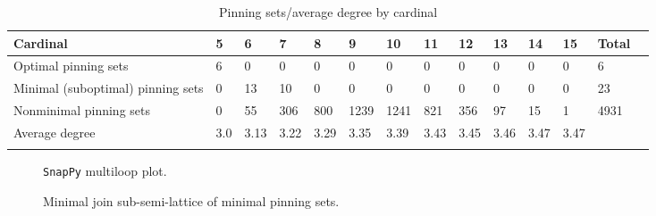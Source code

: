 \documentclass{article}%
\begin{document}
\begin{table}[ht]
	\caption{Pinning sets/average degree by cardinal}
	\centering
	\renewcommand{\arraystretch}{1.5}
	\begin{tabularx}{\textwidth}{lXXXXXXXXXXXXX}
		\toprule
			Cardinal & 5 & 6 & 7 & 8 & 9 & 10 & 11 & 12 & 13 & 14 & 15 & Total\\
			\hline
			Optimal pinning sets & 6 & 0 & 0 & 0 & 0 & 0 & 0 & 0 & 0 & 0 & 0 & 6 \\
			Minimal (suboptimal) pinning sets & 0 & 13 & 10 & 0 & 0 & 0 & 0 & 0 & 0 & 0 & 0 & 23 \\
			Nonminimal pinning sets & 0 & 55 & 306 & 800 & 1239 & 1241 & 821 & 356 & 97 & 15 & 1 & 4931 \\
			Average degree & 3.0 & 3.13 & 3.22 & 3.29 & 3.35 & 3.39 & 3.43 & 3.45 & 3.46 & 3.47 & 3.47 &  \\
		\bottomrule \\ 
	\end{tabularx}
\end{table}

\begin{multicols}{2}
\begin{figure}[H]
\centering

\caption{\texttt{SnapPy} multiloop plot.}
\label{fig:tex/img/[[17, 26, 18, 1], [16, 7, 17, 8], [25, 6, 26, 7], [18, 6, 19, 5], [1, 22, 2, 23], [8, 23, 9, 24], [24, 15, 25, 16], [19, 10, 20, 11], [11, 4, 12, 5], [12, 21, 13, 22], [2, 13, 3, 14], [9, 14, 10, 15],.svg}
\end{figure}
\columnbreak

\begin{figure}[H]
\centering
\scalebox{0.8}{}
\caption{Minimal join sub-semi-lattice of minimal pinning sets.}
\label{fig:tex/img/[[17, 26, 18, 1], [16, 7, 17, 8], [25, 6, 26, 7], [18, 6, 19, 5], [1, 22, 2, 23], [8, 23, 9, 24], [24, 15, 25, 16], [19, 10, 20, 11], [11, 4, 12, 5], [12, 21, 13, 22], [2, 13, 3, 14], [9, 14, 10, 15],.pgf}
\end{figure}
\end{multicols}
\end{document}

